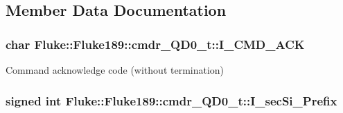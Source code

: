 \subsection{Member Data Documentation}
\hypertarget{structFluke_1_1Fluke189_1_1cmdr__QD0__t_ab46dd039cec29950bccb5090537d6272}{
\subsubsection[{I\_\-CMD\_\-ACK}]{\setlength{\rightskip}{0pt plus 5cm}char {\bf Fluke::Fluke189::cmdr\_\-QD0\_\-t::I\_\-CMD\_\-ACK}}}
\label{structFluke_1_1Fluke189_1_1cmdr__QD0__t_ab46dd039cec29950bccb5090537d6272}
Command acknowledge code (without termination) \hypertarget{structFluke_1_1Fluke189_1_1cmdr__QD0__t_a3bc502dcc711f5c308028b588e57e226}{
\subsubsection[{I\_\-secSi\_\-Prefix}]{\setlength{\rightskip}{0pt plus 5cm}signed int {\bf Fluke::Fluke189::cmdr\_\-QD0\_\-t::I\_\-secSi\_\-Prefix}}}
\label{structFluke_1_1Fluke189_1_1cmdr__QD0__t_a3bc502dcc711f5c308028b588e57e226}


